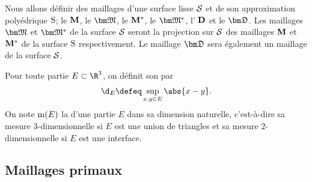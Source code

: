 
Nous allons définir des maillages \ddfv d'une surface lisse $\mathcal{S}$ et de son approximation polyédrique $\mathrm{S}$; le  $\mathbf{M}$, le  $\ensprimal$, le  ${\mathbf{M}^\ast}$, le  $\ensdual$, l' $\mathbf{D}$ et le  $\ensdiamant$. Les maillages $\ensprimal$ et $\ensdual$ de la surface $\mathcal{S}$ seront la projection sur $\mathcal{S}$ des maillages $\mathbf{M}$ et ${\mathbf{M}^\ast}$ de la surface $\mathrm{S}$ respectivement. Le maillage $\ensdiamant$ sera également un maillage de la surface $\mathcal{S}$. 

Pour toute partie $E \subset \R^3$, on définit son  par
\begin{equation} \label{eq:diamE}
\diam{E} \defeq \sup\limits_{x,y \in E} \abs{x - y}.
\end{equation}
On note $\operatorname{m}(E)$ la  d'une partie $E$ dans sa dimension naturelle, c'est-à-dire sa mesure $3$-dimensionnelle si $E$ est une union de triangles et sa mesure $2$-dimensionnelle si $E$ est une interface.

\subsection{Maillages primaux} \label{sec:maillages_primaux}

